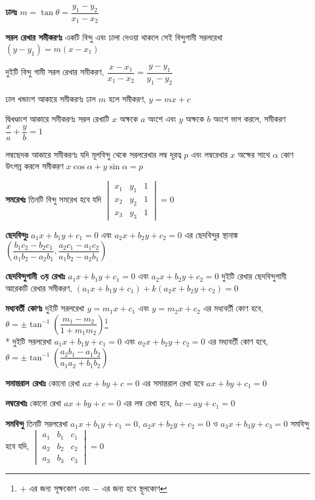 \documentclass[a4paper,12pt]{article}
\newcommand{\lt}{\left}
\newcommand{\rt}{\right}
\begin{document}
\textbf{ঢালঃ} $m=\tan \theta = \dfrac{y_1-y_2}{x_1-x_2}$

\textbf{সরল রেখার সমীকরণঃ} একটি বিন্দু এবং ঢালা দেওয়া থাকলে সেই বিন্দুগামী সরলরেখা $(y-y_1)=m(x-x_1)$

দুইটি বিন্দু গামী সরল রেখার সমীকরণ, $\dfrac{x-x_1}{x_1-x_2}=\dfrac{y-y_1}{y_1-y_2}$

ঢাল খন্ডাংশ আকারে সমীকরণঃ ঢাল $m$ হলে সমীকরণ, $y=mx+c$

দ্বিখণ্ডাংশ আকারে সমীকরণঃ সরল রেখাটি $x$ অক্ষকে $a$ অংশে এবং $y$ অক্ষকে $b$ অংশে ভাগ করলে, সমীকরণ $\dfrac{x}{a}+\dfrac{y}{b}=1$

লম্বছেদক আকারে সমীকরণঃ যদি মূলবিন্দু থেকে সরলরেখার লম্ব দূরত্ব $p$ এবং লম্বরেখার $x$ অক্ষের সাথে $\alpha$ কোণ উৎপন্ন করলে সমীকরণ $x\cos \alpha + y\sin \alpha=p$

\textbf{সমরেখঃ} তিনটি বিন্দু সমরেখ হবে যদি $\begin{vmatrix}
    x_1 & y_1 & 1 \\
    x_2 & y_2 & 1 \\
    x_3 & y_3 & 1 
\end{vmatrix}=0$

\textbf{ছেদবিন্দুঃ} $a_1x+b_1y+c_1=0$ এবং $a_2x+b_2y+c_2=0$ এর ছেদবিন্দুর স্থানাঙ্ক $\lt( \dfrac{b_1c_2-b_2c_1}{a_1b_2-a_2b_1}, \dfrac{a_2c_1-a_1c_2}{a_1b_2-a_2b_1}\rt)$

\textbf{ছেদবিন্দুগামী ৩য় রেখাঃ} $a_1x+b_1y+c_1=0$ এবং $a_2x+b_2y+c_2=0$ দুইটি রেখার ছেদবিন্দুগামী আরেকটি রেখার সমীকরণ, $(a_1x+b_1y+c_1)+k(a_2x+b_2y+c_2)=0$

\textbf{মধ্যবর্তী কোণঃ} দুইটি সরলরেখা $y=m_1x+c_1$ এবং $y=m_2x+c_2$ এর মধ্যবর্তী কোণ হবে, $\theta= \pm \tan^{-1} \lt( \dfrac{m_1-m_2}{1+m_1m_2}\rt)$\footnote{$+$ এর জন্য সূক্ষকোণ এবং $-$ এর জন্য হবে স্থূলকোণ}\\*
দুইটি সরলরেখা $a_1x+b_1y+c_1=0$ এবং $a_2x+b_2y+c_2=0$ এর মধ্যবর্তী কোণ হবে, $\theta = \pm \tan^{-1} \lt( \dfrac{a_2b_1-a_1b_2}{a_1a_2+b_1b_2}\rt)$

\textbf{সমান্তরাল রেখাঃ} কোনো রেখা $ax+by+c=0$ এর সমান্তরাল রেখা হবে $ax+by+c_1=0$ 

\textbf{লম্বরেখাঃ} কোনো রেখা $ax+by+c=0$ এর লম্ব রেখা হবে, $bx-ay+c_1=0$ 

\textbf{সমবিন্দু} তিনটি সরলরেখা $a_1x+b_1y+c_1=0$, $a_2x+b_2y+c_2=0$ ও $a_3x+b_3y+c_3=0$ সমবিন্দু হবে যদি, $\begin{vmatrix}
    a_1 & b_1 & c_1\\
    a_2 & b_2 & c_2\\
    a_3 & b_3 & c_3
\end{vmatrix}=0$
\end{document}
